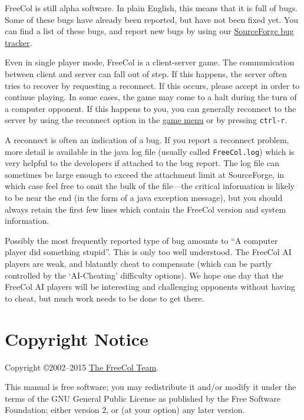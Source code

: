 \documentclass[12pt]{book}
\begin{document}
FreeCol is still alpha software. In plain English, this means that it
is full of bugs. Some of these bugs have already been reported, but
have not been fixed yet. You can find a list of these bugs, and report
new bugs by using our
\href{http://sourceforge.net/tracker/?group_id=43225&atid=435578}{SourceForge
bug tracker}.

Even in single player mode, FreeCol is a client-server game. The
communication between client and server can fall out of step. If this
happens, the server often tries to recover by requesting a
reconnect. If this occurs, please accept in order to continue
playing. In some cases, the game may come to a halt during the turn of
a computer opponent. If this happens to you, you can generally
reconnect to the server by using the reconnect option in the
\hyperlink{game menu}{game menu} or by pressing \verb$ctrl-r$.

A reconnect is often an indication of a bug.  If you report a
reconnect problem, more detail is available in the java log file
(usually called \texttt{FreeCol.log}) which is very helpful to the
developers if attached to the bug report.  The log file can sometimes
be large enough to exceed the attachment limit at SourceForge, in
which case feel free to omit the bulk of the file---the critical
information is likely to be near the end (in the form of a
java exception message), but you should always retain the first few
lines which contain the FreeCol version and system information.

Possibly the most frequently reported type of bug amounts to ``A
computer player did something stupid''.  This is only too well
understood.  The FreeCol AI players are weak, and blatantly cheat to
compensate (which can be partly controlled by the `AI-Cheating'
difficulty options).  We hope one day that the FreeCol AI players will
be interesting and challenging opponents without having to cheat,
but much work needs to be done to get there.

\hypertarget{Copyright Notice}{\chapter{Copyright Notice}}

Copyright \copyright 2002--2015
\href{http://freecol.sourceforge.net/index.php?section=8}{The FreeCol
Team}.

This manual is free software; you may redistribute it and/or modify it
under the terms of the GNU General Public License as published by the
Free Software Foundation; either version 2, or (at your option) any
later version.
\end{document}
